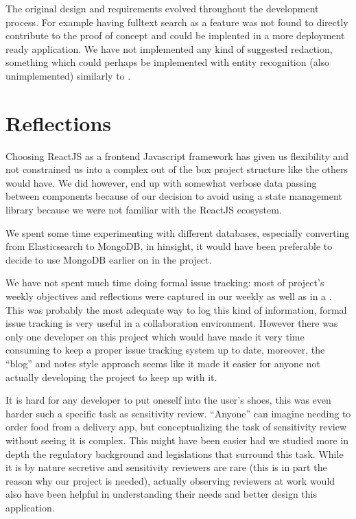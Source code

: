 \documentclass[\version]{l4proj}
\begin{document}
The original design and requirements evolved throughout the development process.
For example having fulltext search as a feature was not found to directly contribute to the proof of concept and could be implented in a more deployment ready application.
We have not implemented any kind of suggested redaction, something which could perhaps be implemented with entity recognition (also unimplemented) similarly to \textcite{RedactedAIRemovea}.

\section{Reflections}

Choosing ReactJS as a frontend Javascript framework has given us flexibility and not constrained us into a complex out of the box project structure like the others would have.
We did however, end up with somewhat verbose data passing between components because of our decision to avoid using a state management library because we were not familiar with the ReactJS ecosystem.

We spent some time experimenting with different databases, especially converting from Elasticsearch to MongoDB, in hinsight, it would have been preferable to decide to use MongoDB earlier on in the project.

We have not spent much time doing formal issue tracking: most of project's weekly objectives and reflections were captured in our weekly \textcite{MeetingNotes2019} as well as in a \textcite{DissertationLogbook2019}.
This was probably the most adequate way to log this kind of information, formal issue tracking is very useful in a collaboration environment.
However there was only one developer on this project which would have made it very time consuming to keep a proper issue tracking system up to date, moreover, the ``blog'' and notes style approach seems like it made it easier for anyone not actually developing the project to keep up with it.

It is hard for any developer to put oneself into the user's shoes, this was even harder such a specific task as sensitivity review.
``Anyone'' can imagine needing to order food from a delivery app, but conceptualizing the task of sensitivity review without seeing it is complex.
This might have been easier had we studied more in depth the regulatory background and legislations that surround this task.
While it is by nature secretive and sensitivity reviewers are rare (this is in part the reason why our project is needed), actually observing reviewers at work would also have been helpful in understanding their needs and better design this application.
\end{document}
